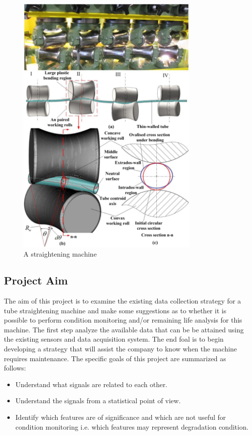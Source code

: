 \documentclass{article}
\begin{document}
\begin{figure}[H]
	\centering
	\includegraphics[width=90mm, keepaspectratio]{Straightening5.png}
	\caption{A straightening machine~\cite{zhang2019modeling}}
	\label{straighteningImage5}
\end{figure}

\subsection{Project Aim}
The aim of this project is to examine the existing data collection strategy for a tube straightening machine and make some suggestions as to whether it is possible to perform condition monitoring and/or remaining life analysis for this machine. The first step analyze the available data that can be be attained using the existing sensors and data acquisition system. The end foal is to begin developing a strategy that will assist the company to know when the machine requires maintenance. The specific goals of this project are summarized as follows:
\begin{itemize}
\item Understand what signals are related to each other.
\item Understand the signals from a statistical point of view.
\item Identify which features are of significance and which are not useful for condition monitoring i.e. which features may represent degradation condition.
\end{itemize}
\clearpage  
\end{document}
